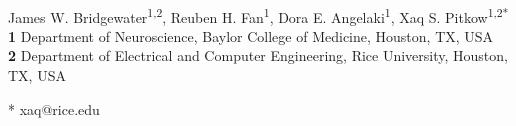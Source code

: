 \documentclass[10pt,letterpaper]{article}
\date{}
\begin{document}
\vspace*{0.2in}

\begin{flushleft}
{\Large
\textbf{}
}
\newline
\\
James W. Bridgewater\textsuperscript{1,2},
Reuben H. Fan\textsuperscript{1},
Dora E. Angelaki\textsuperscript{1},
Xaq S. Pitkow\textsuperscript{1,2*}
\\
\bigskip
\textbf{1} Department of Neuroscience, Baylor College of Medicine, Houston, TX,
USA
\\
\textbf{2} Department of Electrical and Computer Engineering, Rice University,
Houston, TX, USA
\\
\bigskip

% 
%





* xaq@rice.edu

\end{flushleft}
\end{document}
